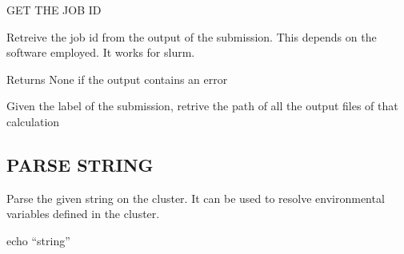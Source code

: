 \documentclass[a4paper,11pt,english]{sphinxmanual}
\begin{document}
\begin{fulllineitems}
\begin{fulllineitems}
\begin{quote}
\begin{description}
\end{description}
\end{quote}

\end{fulllineitems}


\begin{fulllineitems}
\label{\detokenize{apireference:sscha.Cluster.Cluster.get_job_id_from_submission_output}}
\pysigstartsignatures
{}
\pysigstopsignatures
\sphinxAtStartPar
GET THE JOB ID

\sphinxAtStartPar
Retreive the job id from the output of the submission. 
This depends on the software employed. It works for slurm.

\sphinxAtStartPar
Returns None if the output contains an error

\end{fulllineitems}


\begin{fulllineitems}
\label{\detokenize{apireference:sscha.Cluster.Cluster.get_output_path}}
\pysigstartsignatures
{}
\pysigstopsignatures
\sphinxAtStartPar
Given the label of the submission, retrive the path of all the output files of that calculation

\end{fulllineitems}


\begin{fulllineitems}
\label{\detokenize{apireference:sscha.Cluster.Cluster.parse_string}}
\pysigstartsignatures
{}
\pysigstopsignatures

\subsection{PARSE STRING}
\label{\detokenize{apireference:parse-string}}
\sphinxAtStartPar
Parse the given string on the cluster. 
It can be used to resolve environmental variables defined in the cluster.
\begin{description}
\sphinxAtStartPar
echo “string”


\end{description}
\end{fulllineitems}
\end{fulllineitems}
\end{document}
